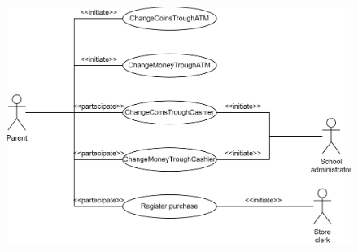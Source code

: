 \begin{enumerate}
        \begin{figure}[H]
            \centering
            \includegraphics[width=0.8\linewidth]{images/usecase2.png}
        \end{figure}
\end{enumerate}